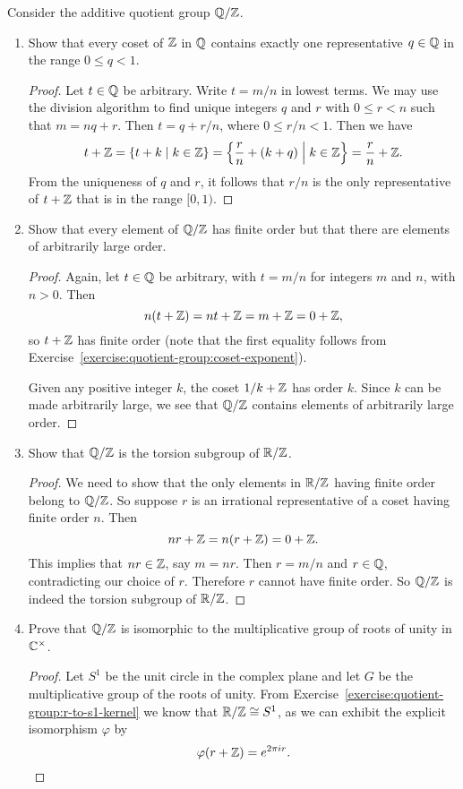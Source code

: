  Consider the additive quotient group $\mathbb{Q}/\mathbb{Z}$.
\begin{enumerate}
\item Show that every coset of $\mathbb{Z}$ in $\mathbb{Q}$ contains exactly one
  representative $q\in\mathbb{Q}$ in the range $0\leq q<1$.
  \begin{proof}
    Let $t\in\mathbb{Q}$ be arbitrary. Write $t = m/n$ in lowest terms. We may
    use the division algorithm to find unique integers $q$ and $r$
    with $0\leq r<n$ such that $m = nq + r$. Then $t = q + r/n$, where
    $0\leq r/n<1$. Then we have
    \begin{equation*}
      t + \mathbb{Z} = \{t + k\mid k\in\mathbb{Z}\}
      = \left\{\frac{r}n + (k+q) \;\middle|\; k\in\mathbb{Z}\right\}
      = \frac{r}n + \mathbb{Z}.
    \end{equation*}
    From the uniqueness of $q$ and $r$, it follows that $r/n$ is the
    only representative of $t + \mathbb{Z}$ that is in the range $[0,1)$.
  \end{proof}
\item Show that every element of $\mathbb{Q}/\mathbb{Z}$ has finite order but that
  there are elements of arbitrarily large order.
  \begin{proof}
    Again, let $t\in\mathbb{Q}$ be arbitrary, with $t = m/n$ for integers $m$
    and $n$, with $n>0$. Then
    \begin{equation*}
      n(t + \mathbb{Z}) = nt + \mathbb{Z} = m + \mathbb{Z} = 0 + \mathbb{Z},
    \end{equation*}
    so $t + \mathbb{Z}$ has finite order (note that the first equality follows
    from Exercise~\ref{exercise:quotient-group:coset-exponent}).

    Given any positive integer $k$, the coset $1/k + \mathbb{Z}$ has order
    $k$. Since $k$ can be made arbitrarily large, we see that $\mathbb{Q}/\mathbb{Z}$
    contains elements of arbitrarily large order.
  \end{proof}
\item Show that $\mathbb{Q}/\mathbb{Z}$ is the torsion subgroup of $\mathbb{R}/\mathbb{Z}$.
  \begin{proof}
    We need to show that the only elements in $\mathbb{R}/\mathbb{Z}$ having finite
    order belong to $\mathbb{Q}/\mathbb{Z}$. So suppose $r$ is an irrational
    representative of a coset having finite order $n$. Then
    \begin{equation*}
      nr + \mathbb{Z} = n(r + \mathbb{Z}) = 0 + \mathbb{Z}.
    \end{equation*}
    This implies that $nr\in\mathbb{Z}$, say $m = nr$. Then $r = m/n$ and
    $r\in\mathbb{Q}$, contradicting our choice of $r$. Therefore $r$ cannot
    have finite order. So $\mathbb{Q}/\mathbb{Z}$ is indeed the torsion subgroup of
    $\mathbb{R}/\mathbb{Z}$.
  \end{proof}
\item Prove that $\mathbb{Q}/\mathbb{Z}$ is isomorphic to the multiplicative group of
  roots of unity in $\mathbb{C}^\times$.
  \begin{proof}
    Let $S^1$ be the unit circle in the complex plane and let $G$ be
    the multiplicative group of the roots of unity. From
    Exercise~\ref{exercise:quotient-group:r-to-s1-kernel} we know that
    $\mathbb{R}/\mathbb{Z} \cong S^1$, as we can exhibit the explicit isomorphism
    $\varphi$ by
    \begin{equation*}
      \varphi(r + \mathbb{Z}) = e^{2\pi ir}.
    \end{equation*}


\end{proof}
\end{enumerate}
